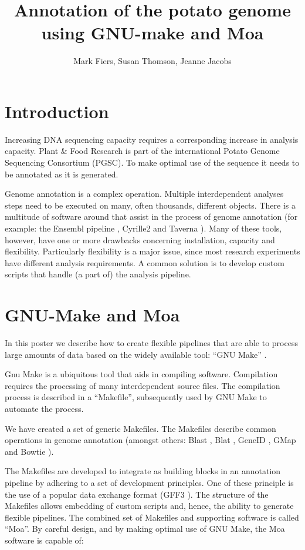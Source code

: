 \documentclass[a4paper,11pt,oneside]{article}
\begin{document}
\title{Annotation of the potato genome using GNU-make and Moa}
\author{Mark Fiers, Susan Thomson, Jeanne Jacobs}

\section{Introduction}

Increasing DNA sequencing capacity requires a corresponding increase
in analysis capacity. Plant \& Food Research is part of the
international Potato Genome Sequencing Consortium (PGSC). To make
optimal use of the sequence it needs to be annotated as it is
generated.

Genome annotation is a complex operation. Multiple interdependent
analyses steps need to be executed on many, often thousands, different
objects. There is a multitude of software around that assist in the
process of genome annotation (for example: the Ensembl pipeline
\citep{Potter2004}, Cyrille2 \citep{Fiers2008} and Taverna
\citep{Oinn2004}). Many of these tools, however, have one or more
drawbacks concerning installation, capacity and flexibility.
Particularly flexibility is a major issue, since most research
experiments have different analysis requirements. A common solution is
to develop custom scripts that handle (a part of) the analysis
pipeline.

\section{GNU-Make and Moa}

In this poster we describe how to create flexible pipelines that are
able to process large amounts of data based on the widely available
tool: ``GNU Make'' \citep{gnumake}.

Gnu Make is a ubiquitous tool that aids in compiling software.
Compilation requires the processing of many interdependent source
files. The compilation process is described in a ``Makefile'',
subsequently used by GNU Make to automate the process.

We have created a set of generic Makefiles. The Makefiles describe
common operations in genome annotation (amongst others: Blast
\citep{Altschul1990}, Blat \citep{Kent2002}, GeneID
\citep{Blanco2007}, GMap \citep{Wu2005} and Bowtie
\citep{Langmead2009}).

The Makefiles are developed to integrate as building blocks in an
annotation pipeline by adhering to a set of development
principles. One of these principle is the use of a popular data
exchange format (GFF3 \citep{GFF}). The structure of the Makefiles
allows embedding of custom scripts and, hence, the ability to generate
flexible pipelines. The combined set of Makefiles and supporting
software is called ``Moa''. By careful design, and by making optimal
use of GNU Make, the Moa software is capable of:
 
\end{document}

